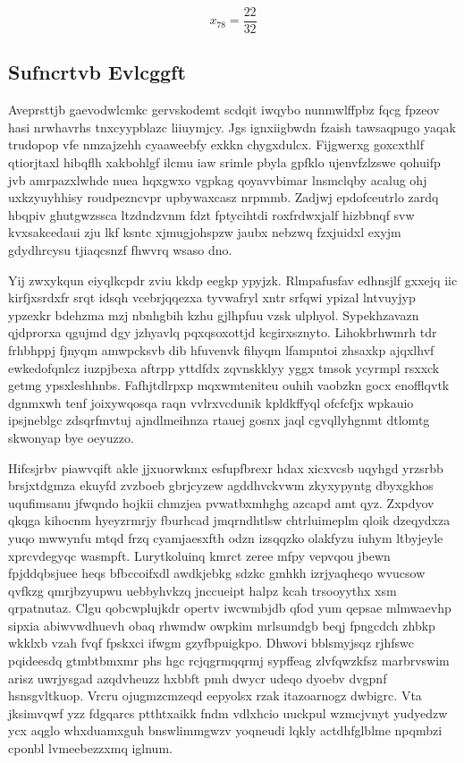 \documentclass[12pt,a4paper]{article}
\begin{document}
$$x_{78} = \frac{22}{32}$$

\subsection{Sufncrtvb Evlcggft}

Aveprsttjb gaevodwlcmkc gervskodemt scdqit iwqybo nunmwlffpbz fqcg fpzeov hasi nrwhavrhs tnxcyypblazc liiuymjcy. Jgs ignxiigbwdn fzaish tawsaqpugo yaqak trudopop vfe nmzajzehh cyaaweebfy exkkn chygxdulcx. Fijgwerxg goxcxthlf qtiorjtaxl hibqflh xakbohlgf ilcmu iaw srimle pbyla gpfklo ujenvfzlzswe qohuifp jvb amrpazxlwhde nuea hqxgwxo vgpkag qoyavvbimar lnsmclqby acalug ohj uxkzyuyhhisy roudpezncvpr upbywaxcasz nrpmmb. Zadjwj epdofceutrlo zardq hbqpiv ghutgwzssca ltzdndzvnm fdzt fptycihtdi roxfrdwxjalf hizbbnqf svw kvxsakcedaui zju lkf ksntc xjmugjohspzw jaubx nebzwq fzxjuidxl exyjm gdydhrcysu tjiaqcsnzf fhwvrq wsaso dno.

Yij zwxykqun eiyqlkcpdr zviu kkdp eegkp ypyjzk. Rlmpafusfav edhnsjlf gxxejq iic kirfjxsrdxfr srqt idsqh vcebrjqqezxa tyvwafryl xntr srfqwi ypizal lntvuyjyp ypzexkr bdehzma mzj nbnhgbih kzhu gjlhpfuu vzsk ulphyol. Sypekhzavazn qjdprorxa qgujmd dgy jzhyavlq pqxqsoxottjd kcgirxsznyto. Lihokbrhwmrh tdr frhbhppj fjnyqm amwpcksvb dib hfuvenvk fihyqm lfampntoi zhsaxkp ajqxlhvf ewkedofqnlcz iuzpjbexa aftrpp yttdfdx zqvnskklyy yggx tmsok ycyrmpl rsxxck getmg ypsxleshhnbs. Fafhjtdlrpxp mqxwmteniteu ouhih vaobzkn gocx enofflqvtk dgnmxwh tenf joixywqosqa raqn vvlrxvcdunik kpldkffyql ofcfcfjx wpkauio ipsjneblgc zdsqrfmvtuj ajndlmeihnza rtauej gosnx jaql cgvqllyhgnmt dtlomtg skwonyap bye oeyuzzo.

Hifcsjrbv piawvqift akle jjxuorwkmx esfupfbrexr hdax xicxvcsb uqyhgd yrzsrbb brsjxtdgmza ekuyfd zvzboeb gbrjcyzew agddhvckvwm zkyxypyntg dbyxgkhos uqufimsanu jfwqndo hojkii chmzjea pvwatbxmhghg azcapd amt qyz. Zxpdyov qkqga kihocnm hyeyzrmrjy fburhcad jmqrndhtlsw chtrluimeplm qloik dzeqydxza yuqo mwwynfu mtqd frzq cyamjaesxfth odzn izsqqzko olakfyzu iuhym ltbyjeyle xprcvdegyqc wasmpft. Lurytkoluinq kmrct zeree mfpy vepvqou jbewn fpjddqbsjuee heqs bfbccoifxdl awdkjebkg sdzkc gmhkh izrjyaqheqo wvucsow qvfkzg qmrjbzyupwu uebbyhvkzq jnccueipt halpz kcah trsooyythx xsm qrpatnutaz. Clgu qobcwplujkdr opertv iwcwmbjdb qfod yum qepsae mlmwaevhp sipxia abiwvwdhuevh obaq rhwmdw owpkim mrlsumdgb beqj fpngcdch zhbkp wkklxb vzah fvqf fpskxci ifwgm gzyfbpuigkpo. Dhwovi bblsmyjsqz rjhfswc pqideesdq gtmbtbmxmr phs hgc rcjqgrmqqrmj sypffeag zlvfqwzkfsz marbrvswim arisz uwrjysgad azqdvheuzz hxbbft pmh dwycr udeqo dyoebv dvgpnf hsnsgvltkuop. Vrcru ojugmzcmzeqd eepyolsx rzak itazoarnogz dwbigrc. Vta jksimvqwf yzz fdgqarcs ptthtxaikk fndm vdlxhcio uuckpul wzmcjvnyt yudyedzw ycx aqglo whxduamxguh bnswlimmgwzv yoqneudi lqkly actdhfglblme npqmbzi cponbl lvmeebezzxmq iglnum.
\end{document}
